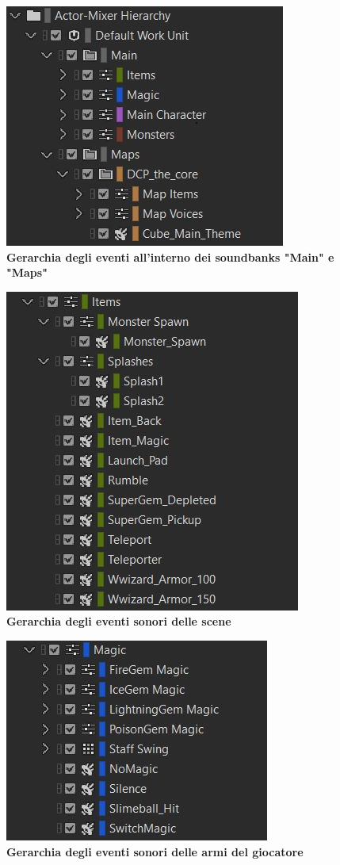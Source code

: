 \newpage
	
	\begin{figure}[h]
		\begin{center}
			\includegraphics[width=.47\textwidth]{img/image2.jpg}
			\caption{\textbf{Gerarchia degli eventi all'interno dei soundbanks "Main" e "Maps"}}
			\label{gr01}
		\end{center}
	\end{figure}

	\begin{figure}[h]
		\begin{center}
			\includegraphics[width=.47\textwidth]{img/image3.jpg}
			\caption{\textbf{Gerarchia degli eventi sonori delle scene}}
			\label{gr01}
		\end{center}
	\end{figure}
	
	\begin{figure}[h]
		\begin{center}
			\includegraphics[width=.47\textwidth]{img/image4.jpg}
			\caption{\textbf{Gerarchia degli eventi sonori delle armi del giocatore}}
			\label{gr01}
		\end{center}
	\end{figure}
		
